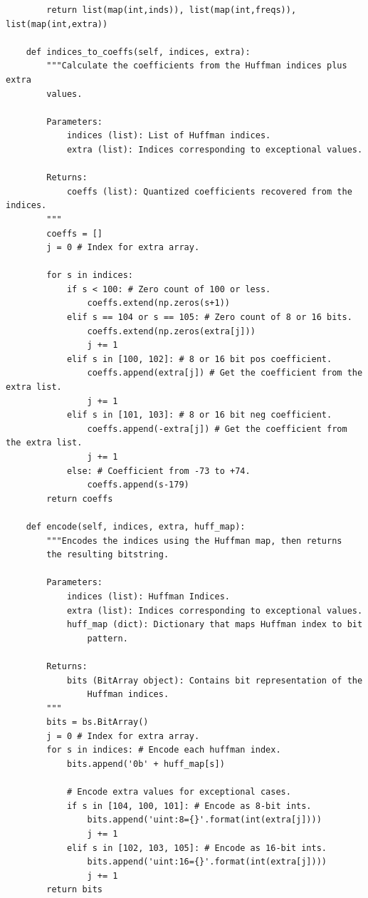 \begin{lstlisting}
        return list(map(int,inds)), list(map(int,freqs)), list(map(int,extra))

    def indices_to_coeffs(self, indices, extra):
        """Calculate the coefficients from the Huffman indices plus extra
        values.

        Parameters:
            indices (list): List of Huffman indices.
            extra (list): Indices corresponding to exceptional values.

        Returns:
            coeffs (list): Quantized coefficients recovered from the indices.
        """
        coeffs = []
        j = 0 # Index for extra array.

        for s in indices:
            if s < 100: # Zero count of 100 or less.
                coeffs.extend(np.zeros(s+1))
            elif s == 104 or s == 105: # Zero count of 8 or 16 bits.
                coeffs.extend(np.zeros(extra[j]))
                j += 1
            elif s in [100, 102]: # 8 or 16 bit pos coefficient.
                coeffs.append(extra[j]) # Get the coefficient from the extra list.
                j += 1
            elif s in [101, 103]: # 8 or 16 bit neg coefficient.
                coeffs.append(-extra[j]) # Get the coefficient from the extra list.
                j += 1
            else: # Coefficient from -73 to +74.
                coeffs.append(s-179)
        return coeffs

    def encode(self, indices, extra, huff_map):
        """Encodes the indices using the Huffman map, then returns
        the resulting bitstring.

        Parameters:
            indices (list): Huffman Indices.
            extra (list): Indices corresponding to exceptional values.
            huff_map (dict): Dictionary that maps Huffman index to bit
                pattern.

        Returns:
            bits (BitArray object): Contains bit representation of the
                Huffman indices.
        """
        bits = bs.BitArray()
        j = 0 # Index for extra array.
        for s in indices: # Encode each huffman index.
            bits.append('0b' + huff_map[s])

            # Encode extra values for exceptional cases.
            if s in [104, 100, 101]: # Encode as 8-bit ints.
                bits.append('uint:8={}'.format(int(extra[j])))
                j += 1
            elif s in [102, 103, 105]: # Encode as 16-bit ints.
                bits.append('uint:16={}'.format(int(extra[j])))
                j += 1
        return bits


\end{lstlisting}
